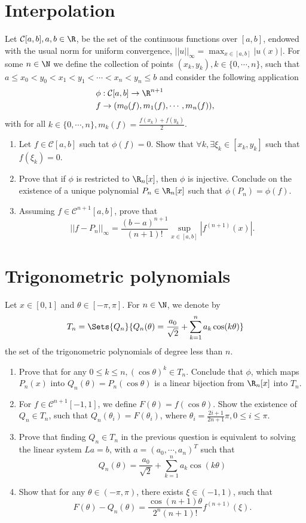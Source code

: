 \section{Interpolation}
Let \(\mathcal{C}[a,b], a,b\in\R\), be the set of the continuous functions over \([a,b]\), endowed with the usual norm for uniform convergence, \(||u||_\infty=\max_{x\in[a,b]}|u(x)|\).
For some \(n\in\N\) we define the collection of points \((x_k,y_k), k\in\{0,\cdots,n\}\), such that \(a\leq x_0<y_0<x_1<y_1<\cdots<x_n<y_n\leq b\) and consider the following application
\begin{align*}
	\phi&:\mathcal{C}[a,b]\to\R^{n+1}\\
	f&\to(m_0(f),m_1(f),\cdots,m_n(f)),
\end{align*}
with for all \(k\in\{0,\cdots,n\},m_k(f)=\frac{f(x_k)+f(y_k)}{2}\).
\begin{enumerate}
	\item Let \(f\in\mathcal{C}[a,b]\) such tat \(\phi(f)=0\).
	Show that \(\forall k,\exists\xi_k\in[x_k,y_k]\) such that \(f(\xi_k)=0\).
	\item Prove that if $\phi$ is restricted to \(\R_n[x]\), then $\phi$ is injective.
	Conclude on the existence of a unique polynomial \(P_n\in\R_n[x]\) such that \(\phi(P_n)=\phi(f)\).
	\item Assuming \(f\in\mathcal{C}^{n+1}[a,b]\), prove that
	\[ ||f-P_n||_\infty=\frac{(b-a)^{n+1}}{(n+1)!}\sup_{x\in[a,b]}|f^{(n+1)}(x)|. \]
\end{enumerate}

\section{Trigonometric polynomials}
Let \(x\in[0,1]\) and \(\theta\in[-\pi,\pi]\).
For \(n\in\N\), we denote by
\[T_n=\Sets{Q_n}{Q_n(\theta)=\frac{a_0}{\sqrt{2}}+\sum_{k=1}^n a_k\cos(k\theta)} \]
the set of the trigonometric  polynomials of degree less than $n$.
\begin{enumerate}
	\item Prove that for any \(0\leq k\leq n, (\cos\theta)^k\in T_n\).
	Conclude that $\phi$, which maps \(P_n(x)\) into \(Q_n(\theta)=P_n(\cos\theta)\) is a linear bijection from \(\R_n[x]\) into $T_n$.
	\item For \(f\in\mathcal{C}^{n+1}[−1,1]\), we define \(F(\theta)=f(\cos\theta)\).
	Show the existence of \(Q_n\in T_n\), such that \(Q_n(\theta_i)=F(\theta_i)\), where \(\theta_i=\frac{2i+1}{2n+1}\pi,0\leq i\leq\pi\).
	\item Prove that finding \(Q_n\in T_n\) in the previous question is equivalent to solving the linear system \(La=b\), with \(a=(a_0,\cdots,a_n)^T\) such that
	\[ Q_n(\theta)=\frac{a_0}{\sqrt{2}}+\sum_{k=1}^n a_k\cos(k\theta) \]
	\item Show that for any \(\theta\in(-\pi,\pi)\), there exists \(\xi\in(-1,1)\), such that
	\[ F(\theta)-Q_n(\theta)=\frac{\cos(n+1)\theta}{2^n(n+1)!}f^{(n+1)}(\xi). \]
\end{enumerate}